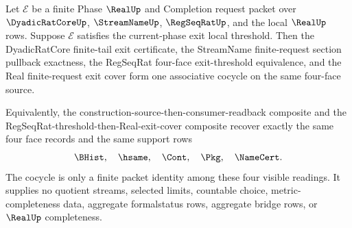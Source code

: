 \begin{theorem}
\label{thm:real-l10-finite-request-exit-cocycle}
Let $\mathcal E$ be a finite Phase $\RealUp$ and Completion request packet over $\DyadicRatCoreUp$, $\StreamNameUp$, $\RegSeqRatUp$, and the local $\RealUp$ rows. Suppose $\mathcal E$ satisfies the current-phase exit local threshold. Then the DyadicRatCore finite-tail exit certificate, the StreamName finite-request section pullback exactness, the RegSeqRat four-face exit-threshold equivalence, and the Real finite-request exit cover form one associative cocycle on the same four-face source.

Equivalently, the construction-source-then-consumer-readback composite and the RegSeqRat-threshold-then-Real-exit-cover composite recover exactly the same four face records and the same support rows
$$
\BHist,\quad \hsame,\quad \Cont,\quad \Pkg,\quad \NameCert.
$$
The cocycle is only a finite packet identity among these four visible readings. It supplies no quotient streams, selected limits, countable choice, metric-completeness data, aggregate formalstatus rows, aggregate bridge rows, or $\RealUp$ completeness.
\end{theorem}
